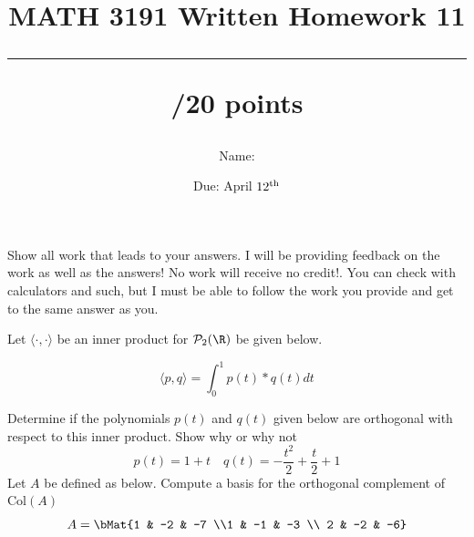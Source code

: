 \documentclass{exam}
\title{MATH 3191 Written Homework 11\\\rule{30pt}{1pt}/20 points}
\author{Name: \rule{150pt}{1pt}}
\date{Due: April $12^\textnormal{th}$}
\renewcommand{\P}{\mathcal{P}}
\begin{document}
\maketitle
Show all work that leads to your answers. I will be providing feedback on the work as well as the answers!
No work will receive no credit!. You can check with calculators and such, but I must be able to follow the work you provide and get to the same answer as you.
\begin{questions}
    \question[10] Let $\langle\cdot,\cdot\rangle$ be an inner product for $\P_2(\R)$
    be given below.

    \[
        \langle p, q \rangle = \int_0^1 p(t)*q(t)dt
    \]

    Determine if the polynomials $p(t)$ and $q(t)$ given below are orthogonal with
    respect to this inner product. Show why or why not
\[
    p(t) = 1+t \quad q(t) = -\frac{t^2}{2} + \frac{t}{2} + 1
\]
\newpage
    \question[10] Let $A$ be defined as below. Compute a basis for the orthogonal complement of $\text{Col}(A)$
    \[
        A = \bMat{1 & -2 & -7 \\1 & -1 & -3 \\ 2 & -2 & -6}
    \]
\end{questions}
\end{document}
